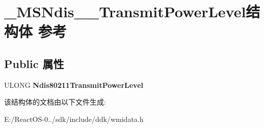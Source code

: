 \hypertarget{struct___m_s_ndis__80211___transmit_power_level}{}\section{\+\_\+\+M\+S\+Ndis\+\_\+\_\+\+Transmit\+Power\+Level结构体 参考}
\label{struct___m_s_ndis__80211___transmit_power_level}
\subsection*{Public 属性}
\begin{DoxyCompactItemize}
\item 
\mbox{\label{struct___m_s_ndis__80211___transmit_power_level_ae2650570916f2f7eacf5a75eaa34063e}} 
U\+L\+O\+NG {\bfseries Ndis80211\+Transmit\+Power\+Level}
\end{DoxyCompactItemize}


该结构体的文档由以下文件生成\+:\begin{DoxyCompactItemize}
\item 
E\+:/\+React\+O\+S-\/0../sdk/include/ddk/wmidata.\+h\end{DoxyCompactItemize}
